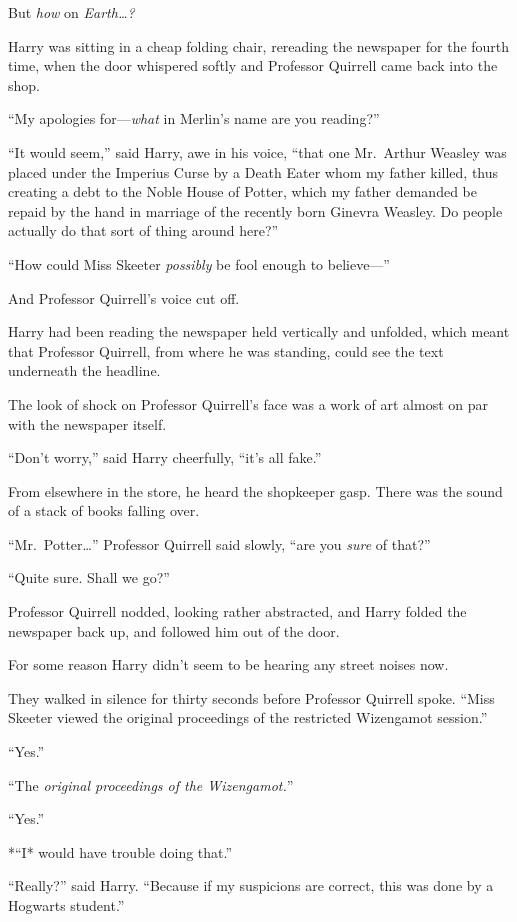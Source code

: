 But \emph{how} on \emph{Earth\ldots{}?}

Harry was sitting in a cheap folding chair, rereading the newspaper for
the fourth time, when the door whispered softly and Professor Quirrell
came back into the shop.

``My apologies for---\emph{what} in Merlin's name are you reading?''

``It would seem,'' said Harry, awe in his voice, ``that one Mr.~Arthur
Weasley was placed under the Imperius Curse by a Death Eater whom my
father killed, thus creating a debt to the Noble House of Potter, which
my father demanded be repaid by the hand in marriage of the recently
born Ginevra Weasley. Do people actually do that sort of thing around
here?''

``How could Miss Skeeter \emph{possibly} be fool enough to believe---''

And Professor Quirrell's voice cut off.

Harry had been reading the newspaper held vertically and unfolded, which
meant that Professor Quirrell, from where he was standing, could see the
text underneath the headline.

The look of shock on Professor Quirrell's face was a work of art almost
on par with the newspaper itself.

``Don't worry,'' said Harry cheerfully, ``it's all fake.''

From elsewhere in the store, he heard the shopkeeper gasp. There was the
sound of a stack of books falling over.

``Mr.~Potter\ldots{}'' Professor Quirrell said slowly, ``are you
\emph{sure} of that?''

``Quite sure. Shall we go?''

Professor Quirrell nodded, looking rather abstracted, and Harry folded
the newspaper back up, and followed him out of the door.

For some reason Harry didn't seem to be hearing any street noises now.

They walked in silence for thirty seconds before Professor Quirrell
spoke. ``Miss Skeeter viewed the original proceedings of the restricted
Wizengamot session.''

``Yes.''

``The \emph{original proceedings of the Wizengamot.}''

``Yes.''

*``I* would have trouble doing that.''

``Really?'' said Harry. ``Because if my suspicions are correct, this was
done by a Hogwarts student.''

